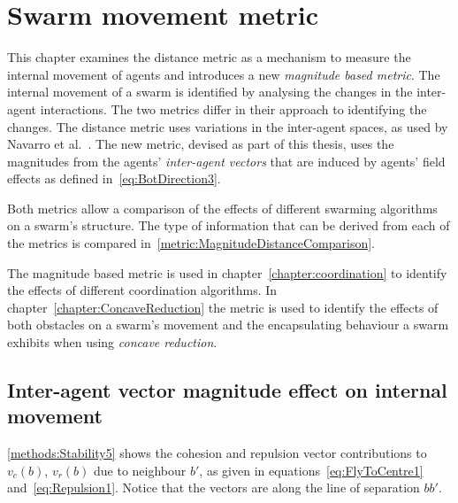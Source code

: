 \chapter{Swarm movement metric}\label{chapter:metric}
This chapter examines the distance metric as a mechanism to measure the internal movement of agents and introduces a new \textit{magnitude based metric}. The internal movement of a swarm is identified by analysing the changes in the inter-agent interactions. The two metrics differ in their approach to identifying the changes. The distance metric uses variations in the inter-agent spaces, as used by Navarro et al.~\cite{NIM:09}. The new metric, devised as part of this thesis, uses the magnitudes from the agents' \textit{inter-agent vectors} that are induced by agents' field effects as defined in~\autoref{eq:BotDirection3}. 

Both metrics allow a comparison of the effects of different swarming algorithms on a swarm's structure. The type of information that can be derived from each of the metrics is compared in~\autoref{metric:MagnitudeDistanceComparison}.

The magnitude based metric is used in chapter~\ref{chapter:coordination} to identify the effects of different coordination algorithms. In chapter~\ref{chapter:ConcaveReduction} the metric is used to identify the effects of both obstacles on a swarm's movement and the encapsulating behaviour a swarm exhibits when using \textit{concave reduction}.
 

\section{Inter-agent vector magnitude effect on internal movement}\label{Section:StabilityMagnitude}
\autoref{methods:Stability5} shows the cohesion and repulsion vector contributions to $v_c(b)$, $v_r(b)$ due to neighbour $b'$, as given in equations~\ref{eq:FlyToCentre1} and~\ref{eq:Repulsion1}. Notice that the vectors are along the line of separation $bb'$. 

